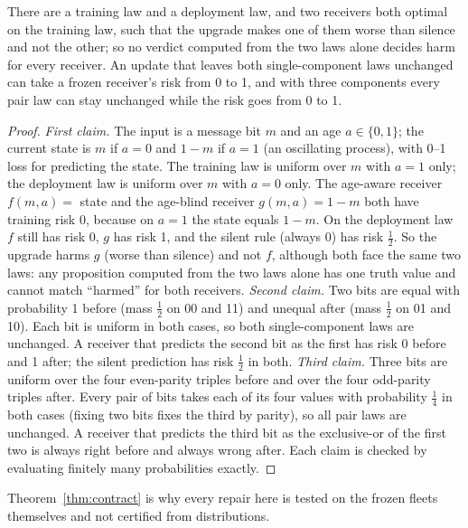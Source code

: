 \begin{theorem}\label{thm:contract}
There are a training law and a deployment law, and two receivers both optimal on the training law, such that the upgrade makes one of them
worse than silence and not the other; so no verdict computed from the two laws alone decides harm for every receiver. An update that leaves
both single-component laws unchanged can take a frozen receiver's risk from 0 to 1, and with three components every pair law can stay
unchanged while the risk goes from 0 to 1.
\end{theorem}
\begin{proof}
\emph{First claim.} The input is a message bit $m$ and an age $a\in\{0,1\}$; the current state is $m$ if $a=0$ and $1-m$ if $a=1$ (an
oscillating process), with 0--1 loss for predicting the state. The training law is uniform over $m$ with $a=1$ only; the deployment law
is uniform over $m$ with $a=0$ only. The age-aware receiver $f(m,a)=$ state and the age-blind receiver $g(m,a)=1-m$ both have training
risk 0, because on $a=1$ the state equals $1-m$. On the deployment law $f$ still has risk 0, $g$ has risk 1, and the silent rule (always
0) has risk $\tfrac12$. So the upgrade harms $g$ (worse than silence) and not $f$, although both face the same two laws: any proposition
computed from the two laws alone has one truth value and cannot match ``harmed'' for both receivers.
\emph{Second claim.} Two bits are equal with probability 1 before (mass $\tfrac12$ on 00 and 11) and unequal after (mass $\tfrac12$ on 01
and 10). Each bit is uniform in both cases, so both single-component laws are unchanged. A receiver that predicts the second bit as the
first has risk 0 before and 1 after; the silent prediction has risk $\tfrac12$ in both.
\emph{Third claim.} Three bits are uniform over the four even-parity triples before and over the four odd-parity triples after. Every pair
of bits takes each of its four values with probability $\tfrac14$ in both cases (fixing two bits fixes the third by parity), so all pair laws
are unchanged. A receiver that predicts the third bit as the exclusive-or of the first two is always right before and always wrong after.
Each claim is checked by evaluating finitely many probabilities exactly.
\end{proof}
Theorem~\ref{thm:contract} is why every repair here is tested on the frozen fleets themselves and not certified from distributions.

